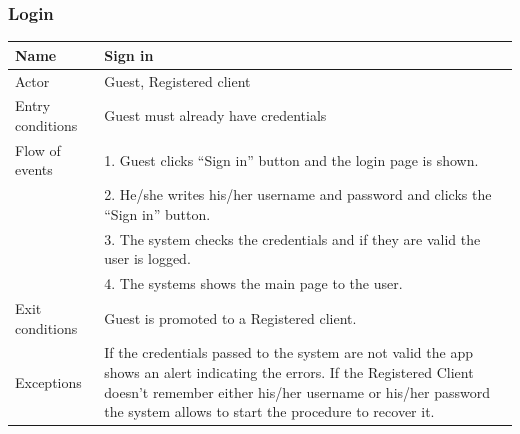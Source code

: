 \clearpage

\subsubsection{Login}

\begin{table}[!h]
\begin{tabularx}{\linewidth}{l|X}
\centering
Name & Sign in \\ \hline
Actor & Guest, Registered client \\ \hline
Entry conditions & Guest must already have credentials \\ \hline
Flow of events & 1. Guest clicks “Sign in” button and the login page is shown. \\
& 2. He/she writes his/her username and password and clicks the “Sign in” button.\\
& 3. The system checks the credentials and if they are valid the user is logged. \\
& 4. The systems shows the main page to the user. \\ \hline
Exit conditions & Guest is promoted to a Registered client. \\ \hline
Exceptions & If the credentials passed to the system are not valid the app shows an alert indicating the errors. If the Registered Client doesn’t remember either his/her username or his/her password the system allows to start the procedure to recover it. \\
\end{tabularx}
\end{table}

\clearpage
